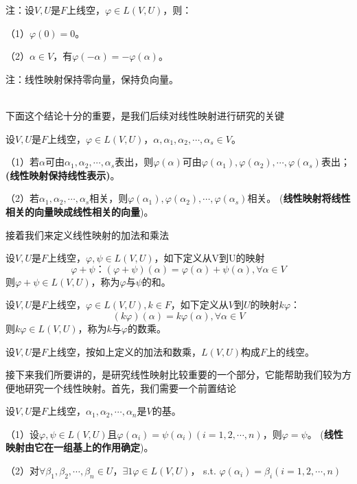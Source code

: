 \documentclass[lang=cn,10pt]{elegantbook}
\begin{document}
	注：设$V,U$是$F$上线空$，\varphi\in L(V,U)$，则：
	
	（1）$\varphi(0)=0$。
	
	（2）$\alpha\in V$，有$\varphi(-\alpha)=-\varphi(\alpha)$。
	
	注：线性映射保持零向量，保持负向量。
	
	~\\
	
	下面这个结论十分的重要，是我们后续对线性映射进行研究的关键
	
	\begin{conclusion}
		设$V,U$是$F$上线空，$\varphi\in L(V,U)，\alpha,\alpha_1,\alpha_2,\cdots,\alpha_s\in V$。
		
		（1）若$\alpha$可由$\alpha_1,\alpha_2,\cdots,\alpha_s$表出，则$\varphi(\alpha)$可由$\varphi(\alpha_1),\varphi(\alpha_2),\cdots,\varphi(\alpha_s)$表出；\textbf{(线性映射保持线性表示)}。
		
		（2）若$\alpha_1,\alpha_2,\cdots,\alpha_s$相关，则$\varphi(\alpha_1),\varphi(\alpha_2),\cdots,\varphi(\alpha_s)$相关。
		(\textbf{线性映射将线性相关的向量映成线性相关的向量})。
	\end{conclusion}
	接着我们来定义线性映射的加法和乘法
	\begin{definition}[加法]
		设$V,U$是$F$上线空，$\varphi,\psi\in L(V,U)$，如下定义从V到U的映射
		\begin{equation*}
			\varphi+\psi：
			(\varphi+\psi)(\alpha)=\varphi(\alpha)+\psi(\alpha),\forall\alpha\in V
		\end{equation*}
		则$\varphi+\psi\in L(V,U)$，称为$\varphi$与$\psi$的和。	
	\end{definition}
	\begin{definition}[数乘]
		设$V,U$是$F$上线空，$\varphi\in L(V,U),k\in F$，如下定义从$V$到$U$的映射$k\varphi$：
		\begin{equation*}
			(k\varphi)(\alpha)=k\varphi(\alpha),\forall\alpha\in V
		\end{equation*}
		则$k\varphi\in L(V,U)$，称为$k$与$\varphi$的数乘。
	\end{definition}
	设$V,U$是$F$上线空，按如上定义的加法和数乘，$L(V,U)$构成$F$上的线空。
	
	接下来我们所要讲的，是研究线性映射比较重要的一个部分，它能帮助我们较为方便地研究一个线性映射。首先，我们需要一个前置结论
	
	\begin{conclusion}
		设$V,U$是$F$上线空，$\alpha_1,\alpha_2,\cdots,\alpha_n$是$V$的基。
		
		（1）设$\varphi,\psi\in L(V,U)$且$\varphi(\alpha_i)=\psi(\alpha_i)(i=1,2,\cdots,n)$，则$\varphi=\psi$。
		(\textbf{线性映射由它在一组基上的作用确定})。
		
		（2）对$\forall\beta_1,\beta_2,\cdots,\beta_n\in U，\exists1\varphi\in L(V,U)$， s.t. $\varphi(\alpha_i)=\beta_i(i=1,2,\cdots,n)$	
	\end{conclusion}
	
\end{document}

